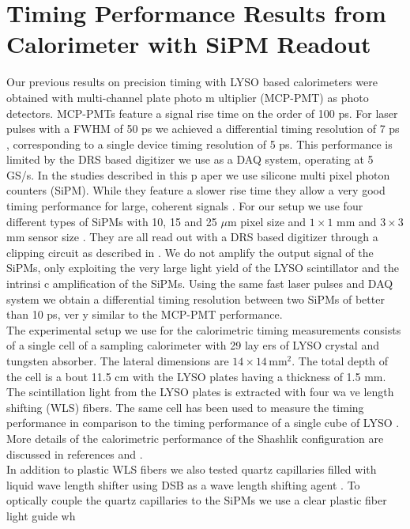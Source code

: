 \section{Timing Performance Results from Calorimeter with SiPM Readout}
\label{sec:beamtiming}

Our previous results on precision timing with LYSO based calorimeters \cite{lysotiming} were obtained with multi-channel plate photo m
ultiplier (MCP-PMT) as photo detectors. MCP-PMTs feature a signal rise time on the order of 100 ps. For laser pulses with a FWHM of 50
 ps we achieved a differential timing resolution of 7 ps \cite{elba2015}, corresponding to a single device timing resolution of 5 ps. 
This performance is limited by the DRS based digitizer we use as a DAQ system, operating at 5 GS/s. In the studies described in this p
aper we use silicone multi pixel photon counters (SiPM).
While they feature a slower rise time they allow a very good timing performance for large, coherent signals \cite{aashrita}.  
For our setup we use four different types of SiPMs with 10, 15 and 25 $\mu$m pixel size and $1 \times 1$ mm and $3 \times 3$ mm sensor
 size \cite{hama}. They are all read out with a DRS based digitizer through a clipping circuit as described in \cite{aashrita}.
We do not amplify the output signal of the SiPMs, only exploiting the very large light yield of the LYSO scintillator and the intrinsi
c
amplification of the SiPMs.
Using the same fast laser pulses and DAQ system we obtain a differential timing resolution between two SiPMs of better than 10 ps, ver
y similar to the MCP-PMT performance.\\ 
The experimental setup we use for the calorimetric timing measurements consists of a single cell of a sampling calorimeter with 29 lay
ers of LYSO crystal and tungsten absorber. The lateral dimensions are $\mathrm{14 \times 14 \,mm^2}$. The total depth of the cell is a
bout 11.5 cm with the LYSO plates having a thickness of 1.5 mm. The scintillation light from the LYSO plates is extracted with four wa
ve length shifting (WLS) fibers. The same cell has been used to measure the timing performance in comparison to the timing performance
 of a single cube of LYSO \cite{lysotiming}. More details of the calorimetric performance of the Shashlik configuration are discussed 
in references \cite{shashlik1} and \cite{shashlik2}.\\
In addition to plastic WLS fibers we also tested quartz capillaries filled with liquid wave length shifter using DSB as a wave length 
shifting agent \cite{capillaries}. To optically couple the quartz capillaries to the SiPMs we use a clear plastic fiber light guide wh
